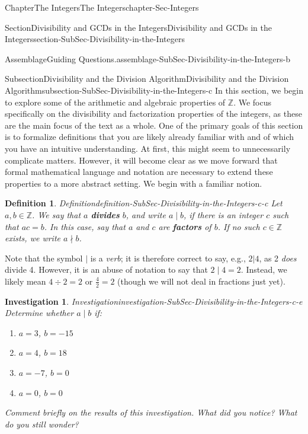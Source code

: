 \documentclass[oneside,10pt,]{book}
\newcommand{\terminology}[1]{\textbf{#1}}
\numberwithin{equation}{section}
\def\Z{{\mathbb Z}}
\newtheorem{definition}[theorem]{Definition}
\newtheorem{investigation}[theorem]{Investigation}
\begin{document}
\begin{chapterptx}{Chapter}{The Integers}{}{The Integers}{}{}{chapter-Sec-Integers}
\begin{sectionptx}{Section}{Divisibility and GCDs in the Integers}{}{Divisibility and GCDs in the Integers}{}{}{section-SubSec-Divisibility-in-the-Integers}
\begin{assemblage}{Assemblage}{Guiding Questions.}{assemblage-SubSec-Divisibility-in-the-Integers-b}
\begin{itemize}[label=\textbullet]
\end{itemize}
%
\end{assemblage}
%
%
\typeout{************************************************}
\typeout{************************************************}
%
\begin{subsectionptx}{Subsection}{Divisibility and the Division Algorithm}{}{Divisibility and the Division Algorithm}{}{}{subsection-SubSec-Divisibility-in-the-Integers-c}
In this section, we begin to explore some of the arithmetic and algebraic properties of \(\Z\). We focus specifically on the divisibility and factorization properties of the integers, as these are the main focus of the text as a whole. One of the primary goals of this section is to formalize definitions that you are likely already familiar with and of which you have an intuitive understanding. At first, this might seem to unnecessarily complicate matters. However, it will become clear as we move forward that formal mathematical language and notation are necessary to extend these properties to a more abstract setting. We begin with a familiar notion.%
\begin{definition}{Definition}{}{definition-SubSec-Divisibility-in-the-Integers-c-c}%
%
%
Let \(a,b\in \Z\). We say that \(a\) \terminology{divides} \(b\), and write \(a\mid b\), if there is an integer \(c\) such that \(ac = b\). In this case, say that \(a\) and \(c\) are \terminology{factors} of \(b\). If no such \(c\in \Z\) exists, we write \(a\nmid b\).%
\end{definition}
Note that the symbol \(|\) is a \emph{verb}; it is therefore correct to say, e.g., \(2|4\), as 2 \emph{does} divide 4. However, it is an abuse of notation to say that \(2\mid 4 = 2\). Instead, we likely mean \(4\div 2 = 2\) or \(\frac{4}{2} = 2\) (though we will not deal in fractions just yet).%
\begin{investigation}{Investigation}{}{investigation-SubSec-Divisibility-in-the-Integers-c-e}%
Determine whether \(a\mid b\) if:%
\begin{enumerate}
\item{}\(a = 3\), \(b = -15\)%
\item{}\(a = 4\), \(b = 18\)%
\item{}\(a = -7\), \(b = 0\)%
\item{}\(a = 0\), \(b = 0\)%
\end{enumerate}
Comment briefly on the results of this investigation. What did you notice? What do you still wonder?%

\end{investigation}
\end{subsectionptx}
\end{sectionptx}
\end{chapterptx}
\end{document}
